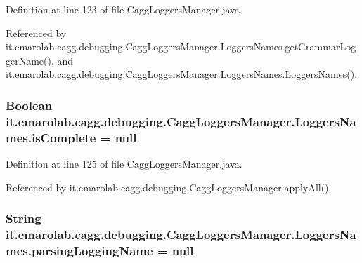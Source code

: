 Definition at line 123 of file Cagg\-Loggers\-Manager.\-java.



Referenced by it.\-emarolab.\-cagg.\-debugging.\-Cagg\-Loggers\-Manager.\-Loggers\-Names.\-get\-Grammar\-Logger\-Name(), and it.\-emarolab.\-cagg.\-debugging.\-Cagg\-Loggers\-Manager.\-Loggers\-Names.\-Loggers\-Names().

\hypertarget{classit_1_1emarolab_1_1cagg_1_1debugging_1_1CaggLoggersManager_1_1LoggersNames_ad2057eb99b120794aab2988db2b2d3c5}{
\subsubsection[{is\-Complete}]{\setlength{\rightskip}{0pt plus 5cm}Boolean it.\-emarolab.\-cagg.\-debugging.\-Cagg\-Loggers\-Manager.\-Loggers\-Names.\-is\-Complete = null\hspace{0.3cm}{\ttfamily [protected]}}}\label{classit_1_1emarolab_1_1cagg_1_1debugging_1_1CaggLoggersManager_1_1LoggersNames_ad2057eb99b120794aab2988db2b2d3c5}


Definition at line 125 of file Cagg\-Loggers\-Manager.\-java.



Referenced by it.\-emarolab.\-cagg.\-debugging.\-Cagg\-Loggers\-Manager.\-apply\-All().

\hypertarget{classit_1_1emarolab_1_1cagg_1_1debugging_1_1CaggLoggersManager_1_1LoggersNames_a695bbbe86f0c7e0010102f9fac57e12e}{
\subsubsection[{parsing\-Logging\-Name}]{\setlength{\rightskip}{0pt plus 5cm}String it.\-emarolab.\-cagg.\-debugging.\-Cagg\-Loggers\-Manager.\-Loggers\-Names.\-parsing\-Logging\-Name = null\hspace{0.3cm}{\ttfamily [private]}}}\label{classit_1_1emarolab_1_1cagg_1_1debugging_1_1CaggLoggersManager_1_1LoggersNames_a695bbbe86f0c7e0010102f9fac57e12e}



